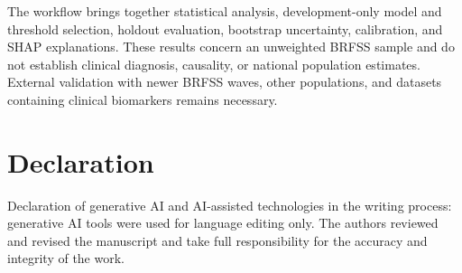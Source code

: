 \documentclass[pdflatex,sn-basic,Numbered]{sn-jnl}
\begin{document}
The workflow brings together statistical analysis, development-only model and threshold selection, holdout evaluation, bootstrap uncertainty, calibration, and SHAP explanations. These results concern an unweighted BRFSS sample and do not establish clinical diagnosis, causality, or national population estimates. External validation with newer BRFSS waves, other populations, and datasets containing clinical biomarkers remains necessary.


\section*{Declaration}

Declaration of generative AI and AI-assisted technologies in the writing
process: generative AI tools were used for language editing only. The authors
reviewed and revised the manuscript and take full responsibility for the
accuracy and integrity of the work.

\backmatter


\end{document}
